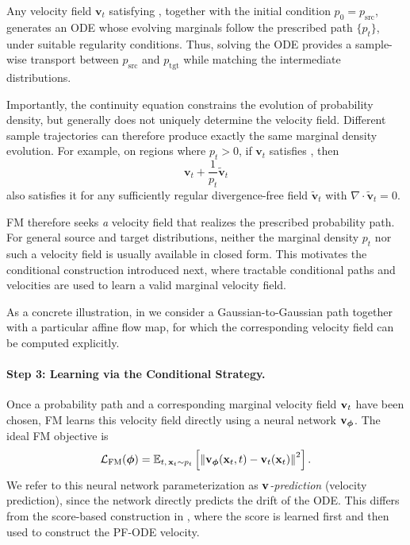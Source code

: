 Any velocity field $\mathbf{v}_t$ satisfying ,
together with the initial condition $p_0=p_{\mathrm{src}}$, generates an ODE
whose evolving marginals follow the prescribed path $\{p_t\}$, under suitable
regularity conditions. Thus, solving the ODE provides a sample-wise transport
between $p_{\mathrm{src}}$ and $p_{\mathrm{tgt}}$ while matching the
intermediate distributions.

Importantly, the continuity equation constrains the evolution of probability
density, but generally does not uniquely determine the velocity field.
Different sample trajectories can therefore produce exactly the same marginal
density evolution. For example, on regions where $p_t>0$, if
$\mathbf{v}_t$ satisfies , then
\[
\mathbf{v}_t
+
\frac{1}{p_t}\tilde{\mathbf{v}}_t
\]
also satisfies it for any sufficiently regular divergence-free field
$\tilde{\mathbf{v}}_t$ with
$\nabla\cdot\tilde{\mathbf{v}}_t=0$.

FM therefore seeks \emph{a} velocity field that realizes the prescribed
probability path. For general source and target distributions, neither the
marginal density $p_t$ nor such a velocity field is usually available in
closed form. This motivates the conditional construction introduced next,
where tractable conditional paths and velocities are used to learn a valid
marginal velocity field.

As a concrete illustration, in
 we consider a Gaussian-to-Gaussian
path together with a particular affine flow map, for which the corresponding
velocity field can be computed explicitly.


\paragraph{Step 3: Learning via the Conditional Strategy.}
Once a probability path and a corresponding marginal velocity field
${\mathbf{v}}_t$ have been chosen, FM learns this velocity field directly using a
neural network ${\mathbf{v}}_{\bm{\phi}}$. The ideal FM objective is
\[
\mathcal{L}_{\mathrm{FM}}(\bm{\phi})
=
\mathbb{E}_{t,\,{\mathbf{x}}_t\sim p_t}
\left[
\left\|
{\mathbf{v}}_{\bm{\phi}}({\mathbf{x}}_t,t)
-
{\mathbf{v}}_t({\mathbf{x}}_t)
\right\|^2
\right].
\]
We refer to this neural network parameterization as
\emph{${\mathbf{v}}$-prediction} (velocity prediction), since the network directly
predicts the drift of the ODE. This differs from the score-based construction
in , where the score is learned first and then used
to construct the PF-ODE velocity.

